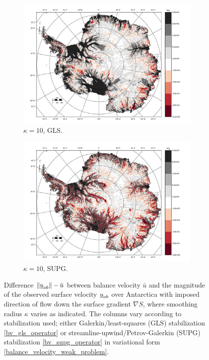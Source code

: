 \begin{figure}
  \begin{subfigure}[b]{0.45\linewidth}
    \includegraphics[width=\linewidth]{images/balance_velocity/antarctica/misfit_10H_kappa_10_GLS.jpg}
  \caption{$\kappa = 10$, GLS.}
  \label{antarctica_bv_image_kappa_5_GLS_misfit}
  \end{subfigure}
  \begin{subfigure}[b]{0.45\linewidth}
    \includegraphics[width=\linewidth]{images/balance_velocity/antarctica/misfit_10H_kappa_10_SUPG.jpg}
  \caption{$\kappa = 10$, SUPG.}
  \label{antarctica_bv_image_kappa_5_SUPG_misfit}
  \end{subfigure}
  
  \caption[Antarctica balance-velocity misfit with $\mathbf{d}^{\text{data}} = - \nabla S$.]{Difference $\Vert \underline{u}_{ob} \Vert - \bar{u}$ between balance velocity $\bar{u}$ and the magnitude of the observed surface velocity $\underline{u}_{ob}$ over Antarctica with imposed direction of flow down the surface gradient $\nabla S$, where smoothing radius $\kappa$ varies as indicated.  The columns vary according to  stabilization used; either Galerkin/least-squares (GLS) stabilization \cref{bv_gls_operator} or streamline-upwind/Petrov-Galerkin (SUPG) stabilization \cref{bv_supg_operator} in variational form \cref{balance_velocity_weak_problem}. \newline \newline}


\end{figure}

